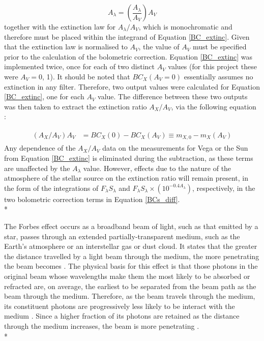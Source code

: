 \documentclass[12pt, a4paper]{report}
\begin{document}
\begin{equation}
A_{\lambda} = \left( \frac{A_{\lambda}}{A_{V}} \right) A_{V}
\label{ratio_eq}
\end{equation}
together with the \cite{1989ApJ...345..245C} extinction law for $A_{\lambda}/A_{V}$, which is monochromatic and therefore must be placed within the integrand of Equation \ref{BC_extinc}. Given that the \cite{1989ApJ...345..245C} extinction law is normalised to $A_{V}$, the value of $A_{V}$ must be specified prior to the calculation of the bolometric correction. Equation \ref{BC_extinc} was implemented twice, once for each of two distinct $A_{V}$ values (for this project these were $A_{V} = 0$, 1). It should be noted that $BC_{X}(A_{V}=0)$ essentially assumes no extinction in any filter. Therefore, two output values were calculated for Equation \ref{BC_extinc}, one for each $A_{V}$ value. The difference between these two outputs was then taken to extract the extinction ratio $A_{X}/A_{V}$, via the following equation \citep{2008PASP..120..583G}:

\begin{align}
\begin{split}
\left(A_{X}/A_{V}\right)A_{V} &= BC_{X}(0) - BC_{X}(A_{V}) \equiv m_{X,0} - m_{X}(A_{V})
\label{BCs_diff}
\end{split}
\end{align}
Any dependence of the $A_{X}/A_{V}$ data on the measurements for Vega or the Sun from Equation \ref{BC_extinc} is eliminated during the subtraction, as these terms are unaffected by the $A_{\lambda}$ value. However, effects due to the nature of the atmosphere of the stellar source on the extinction ratio will remain present, in the form of the integrations of $F_{\lambda}S_{\lambda}$ and $F_{\lambda}S_{\lambda} \times \left( 10^{-0.4 A_{\lambda}} \right)$, respectively, in the two bolometric correction terms in Equation \ref{BCs_diff}. \\*

The Forbes effect occurs as a broadband beam of light, such as that emitted by a star, passes through an extended partially-transparent medium, such as the Earth's atmosphere or an interstellar gas or dust cloud. It states that the greater the distance travelled by a light beam through the medium, the more penetrating the beam becomes \citep{1842RSPT..132..225F}. The physical basis for this effect is that those photons in the original beam whose wavelengths make them the most likely to be absorbed or refracted are, on average, the earliest to be separated from the beam path as the beam through the medium. Therefore, as the beam travels through the medium, its constituent photons are progressively less likely to be interact with the medium \citep{1995A&AS..109..293G}. Since a higher fraction of its photons are retained as the distance through the medium increases, the beam is more penetrating \citep{OHVRIL1999305}.\\*
\end{document}
